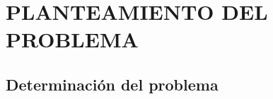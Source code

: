 \documentclass[12pt,a4paper]{article}
\begin{document}
\newpage{}
\newpage

\flushbottom 

\renewcommand{\contentsname}{ÍNDICE DE CONTENIDOS}
\tableofcontents

\renewcommand\listfigurename{Lista de figuras} 
\listoffigures

\renewcommand\listtablename{Lista de tablas} 
\listoftables

\setcounter{page}{1}


\section{PLANTEAMIENTO DEL PROBLEMA}
\subsection{Determinación del problema}
\end{document}
